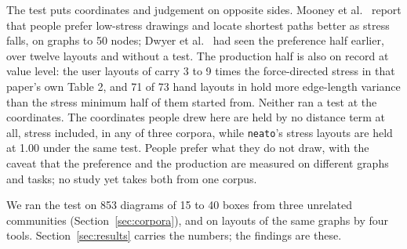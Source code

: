 \documentclass[11pt]{article}
\begin{document}
The test puts coordinates and judgement on opposite sides. Mooney et al.\
\cite{mooney25} report that people prefer low-stress drawings and locate shortest paths
better as stress falls, on graphs to 50 nodes; Dwyer et al.\ \cite{dwyer09} had seen the
preference half earlier, over twelve layouts and without a test. The production half is
also on record at value level: the user layouts of \cite{dwyer09} carry 3 to 9 times the
force-directed stress in that paper's own Table 2, and 71 of 73 hand layouts in
\cite{vanham08} hold more edge-length variance than the stress minimum half of them
started from. Neither ran a test at the coordinates. The coordinates people
drew here are held by no distance term at all, stress included, in any of three corpora,
while \texttt{neato}'s stress layouts are held at 1.00 under the same test. People prefer
what they do not draw, with the caveat that the preference and the production are
measured on different graphs and tasks; no study yet takes both from one corpus.

We ran the test on 853 diagrams of 15 to 40 boxes from three unrelated communities
(Section~\ref{sec:corpora}), and on layouts of the same graphs by four tools.
Section~\ref{sec:results} carries the numbers;
the findings are these.
\end{document}
